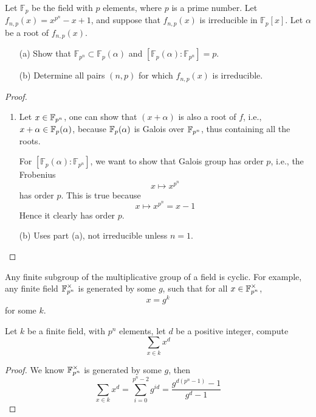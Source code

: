 \begin{prob}[S2005-Q2]
    Let \(\mathbb{F}_p\) be the field with \(p\) elements, where \(p\) is a prime number. Let \(f_{n,p}(x) = x^{p^n} - x + 1\), and suppose that \(f_{n,p}(x)\) is irreducible in \(\mathbb{F}_p[x]\). Let \(\alpha\) be a root of \(f_{n,p}(x)\).
    \begin{itemize}
        \item[(a)] Show that \(\mathbb{F}_{p^n} \subset \mathbb{F}_p(\alpha)\) and \([\mathbb{F}_p(\alpha) : \mathbb{F}_{p^n}] = p\).
        \item[(b)] Determine all pairs \((n, p)\) for which \(f_{n,p}(x)\) is irreducible.
    \end{itemize}
\end{prob}
\begin{proof}
    \begin{enumerate}
        \item Let $x\in\mathbb{F}_{p^n}$, one can show that $(x+\alpha)$ is also a root of $f$, i.e., $x+\alpha\in\mathbb{F}_p(\alpha)$, because $\mathbb{F}_{p}(\alpha)$ is Galois over $\mathbb{F}_{p^n}$, thus containing all the roots. 
        
        For $[\mathbb{F}_p(\alpha) : \mathbb{F}_{p^n}]$, we want to show that Galois group has order $p$, i.e., the Frobenius 
        \begin{equation*}
            x\mapsto x^{p^n}
        \end{equation*}
        has order $p$. This is true because 
        \begin{equation*}
            x\mapsto x^{p^n}=x-1
        \end{equation*}
        Hence it clearly has order $p$.
        \item[(b)] Uses part (a), not irreducible unless $n=1$.
    \end{enumerate}
\end{proof}



\begin{prop}
    Any finite subgroup of the multiplicative group of a field is cyclic. For example, any finite field $\mathbb{F}_{p^n}^\times$ is generated by some $g$, such that for all $x\in\mathbb{F}_{p^n}^\times$,
    \begin{equation*}
        x=g^{k}
    \end{equation*}
    for some $k$.
\end{prop}

\begin{prob}[F2005-Q1]
    Let $k$ be a finite field, with $p^n$ elements, let $d$ be a positive integer, compute 
    \begin{equation*}
        \sum_{x\in k}x^d
    \end{equation*}
\end{prob}
\begin{proof}
    We know $\mathbb{F}_{p^n}^\times$ is generated by some $g$, then 
    \begin{equation*}
        \sum_{x\in k}x^d=\sum_{i=0}^{p^n-2}g^{id}=\frac{g^{d(p^n-1)}-1}{g^d-1}
    \end{equation*}
\end{proof}





